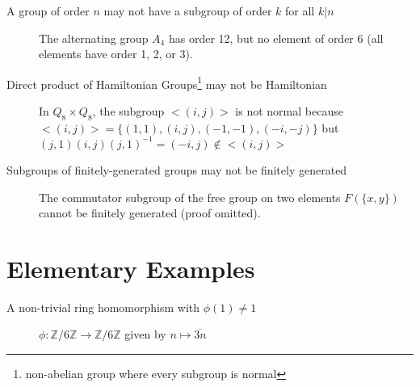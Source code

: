 \documentclass[]{article}
\newcommand{\x}{\times}
\newcommand{\Z}{\mathbb{Z}}
\begin{document}
\begin{description}
\item[A group of order $n$ may not have a subgroup of order $k$ for all $k | n$]
The alternating group $A_4$ has order 12, but no element of order 6 (all
elements have order 1, 2, or 3).

\item[Direct product of Hamiltonian Groups\footnote{non-abelian group where
every subgroup is normal} may not be Hamiltonian]
In $Q_8 \x Q_8$, the subgroup $<(i, j)>$ is not normal because $<(i, j)> = \{(1,
1), (i, j), (-1, -1), (-i, -j) \}$ but $(j, 1)(i, j)(j, 1)^{-1} = (-i, j)
\not\in <(i, j)>$

\item[Subgroups of finitely-generated groups may not be finitely generated]
The commutator subgroup of the free group on two elements $F(\{x, y\})$ cannot
be finitely generated (proof omitted).

\end{description}

\newpage
\section*{Elementary Examples}
\begin{description}
\item [A non-trivial ring homomorphism with $\phi(1) \neq 1$]
$\phi: \Z/6\Z \to \Z/6\Z$ given by $n \mapsto \overline{3n}$
\end{description}
\end{document}
